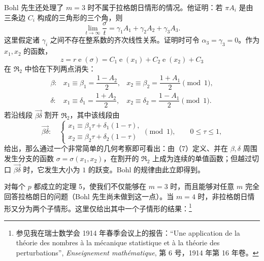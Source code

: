 \documentclass[UTF8,11pt,a4paper,fontset=none]{ctexart}
\theoremstyle{weylthm}
\newcommand{\e}{\operatorname{e}}
\begin{document}
Bohl 先生还处理了 \(m=3\) 时不属于拉格朗日情形的情况。他证明：若
\(\pi A_i\) 是由三条边 \(C_i\) 构成的三角形的三个角，则
\begin{equation}
  \lim_{t\to\infty}\frac{\sigma}{t}
  =\gamma_1A_1+\gamma_2A_2+\gamma_3A_3.
  \tag{6}
\end{equation}
这里假定诸 \(\gamma_i\) 之间不存在整系数的齐次线性关系。证明时可令
\(\alpha_3=\gamma_3=0\)。作为 \(x_1,x_2\) 的函数，
\begin{equation}
  z=r\e(\sigma)=C_1\e(x_1)+C_2\e(x_2)+C_3
  \tag{7}
\end{equation}
在 \(\mathfrak R_2\) 中恰在下列两点消失：
\[
\begin{array}{lll}
\beta: & x_1\equiv\beta_1=\dfrac{1-A_2}{2},
& x_2\equiv\beta_2=\dfrac{1+A_1}{2} \pmod 1,\\[0.9em]
\delta: & x_1\equiv\delta_1=\dfrac{1+A_2}{2},
& x_2\equiv\delta_2=\dfrac{1-A_1}{2} \pmod 1.
\end{array}
\]
若沿线段 \(\overrightarrow{\beta\delta}\) 割开 \(\mathfrak R_2\)，其中该线段由
\[
\overrightarrow{\beta\delta}:\quad
\begin{cases}
 x_1\equiv\beta_1\tau+\delta_1(1-\tau),\\
 x_2\equiv\beta_2\tau+\delta_2(1-\tau)
\end{cases}
\pmod 1,
\qquad 0\leq\tau\leq 1,
\]
给出，那么通过一个非常简单的几何考察即可看出：由（7）定义、并在
\(\beta,\delta\) 周围发生分支的函数
\(\sigma=\sigma(x_1,x_2)\)，在割开的 \(\mathfrak R_2\) 上成为连续的单值函数；但越过切口
\(\overrightarrow{\beta\delta}\) 时，它发生大小为 \(1\) 的跃变。Bohl 的规律由此立即得到。

对每个 \(p\) 都成立的定理 5，使我们不仅能够在 \(m=3\) 时，而且能够对任意
\(m\) 完全回答拉格朗日的问题（Bohl 先生尚未做到这一点）。当 \(m=4\) 时，非拉格朗日情形又分为两个子情形。这里仅给出其中一个子情形的结果：\footnote{参见我在瑞士数学会 1914 年春季会议上的报告：``Une application de la théorie des nombres à la mécanique statistique et à la théorie des perturbations'', \emph{Enseignement mathématique}, 第 6 号，1914 年第 16 年卷。}
\end{document}
